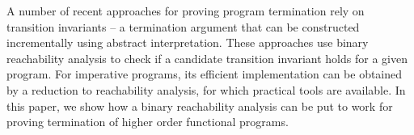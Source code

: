 %

A number of recent approaches for proving program termination rely on
transition invariants -- a termination argument that can be
constructed incrementally using abstract interpretation.
These approaches use binary reachability analysis to check if a
candidate transition invariant holds for a given program.
For imperative programs, its efficient implementation can be obtained
by a reduction to reachability analysis, for which practical tools
are available.
In this paper, we show how a binary reachability analysis can be put
to work for proving termination of higher order functional programs.


